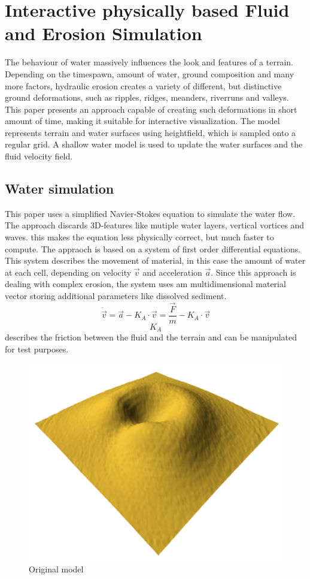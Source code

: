 \section{Interactive physically based Fluid and Erosion Simulation}
The behaviour of water massively influences the look and features of a terrain. Depending on the timespawn, amount of water, ground composition and many more factors, hydraulic erosion creates a variety of different, but distinctive ground deformations, such as ripples, ridges, meanders, riverruns and valleys. 
This paper \cite{Neidhold:2005:IPB:2381356.2381361} presents an approach capable of creating such deformations in short amount of time, making it suitable for interactive visualization. The model represents terrain and water surfaces using heightfield, which is sampled onto a regular grid. A shallow water model is used to update the water surfaces and the fluid velocity field. 

\subsection{Water simulation}
This paper uses a simplified Navier-Stokes equation to simulate the water flow. The approach discards 3D-features like mutiple water layers, vertical vortices and waves. this makes the equation less physically correct, but much faster to compute. The appraoch is based on a system of first order differential equations. This system describes the movement of material, in this case the amount of water at each cell, depending on velocity $\vec{v}$ and acceleration $\vec{a}$. Since this approach is dealing with complex erosion, the system uses am multidimensional material vector storing additional parameters like dissolved sediment.
$$\dot{\vec{v}} = \vec{a} -K_A \cdot \vec{v}=\frac{\vec{F}}{m} - K_A\cdot \vec{v}$$
$$K_A$$ describes the friction between the fluid and the terrain and can be manipulated for test purposes. 

\begin{figure}
	\centering
	\includegraphics[width=\linewidth]{NWD05/hydraulic_errosion_a}
	\caption{Original model}
	\label{fig:calc_acceleration}
\end{figure}

